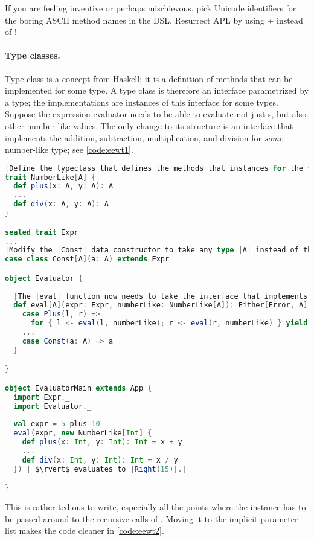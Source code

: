 \documentclass[10 pt]{article}
\begin{document}
\begin{example}
If you are feeling inventive or perhaps mischievous, pick Unicode identifiers for the boring ASCII method names in the DSL. Resurrect APL by using ÷ instead of !
\end{example}

\paragraph{Type classes.} Type class is a concept from Haskell\cite{haskell}; it is a definition of methods that can be implemented for some type. A type class is therefore an interface parametrized by a type; the implementations are instances of this interface for some types. Suppose the expression evaluator needs to be able to evaluate not just s, but also other number-like values. The only change to its structure is an interface that implements the addition, subtraction, multiplication, and division for \emph{some} number-like type; see \autoref{code:eewt1}.

\begin{lstlisting}[caption={Expression evaluator without typeclasses}, label={code:eewt1}, language=Scala, escapechar=|]
|Define the typeclass that defines the methods that instances for the type |A| must implement.|
trait NumberLike[A] {
  def plus(x: A, y: A): A
  ...
  def div(x: A, y: A): A
}

sealed trait Expr
...
|Modify the |Const| data constructor to take any type |A| instead of the concrete |Int|.|
case class Const[A](a: A) extends Expr

object Evaluator {
 
  |The |eval| function now needs to take the interface that implements the number-like behaviour for type |A|.| 
  def eval[A](expr: Expr, numberLike: NumberLike[A]): Either[Error, A] = expr match {
    case Plus(l, r) => 
      for { l <- eval(l, numberLike); r <- eval(r, numberLike) } yield numberLike.plus(l, r)
    ...
    case Const(a: A) => a
  }

}

object EvaluatorMain extends App {
  import Expr._
  import Evaluator._
  
  val expr = 5 plus 10
  eval(expr, new NumberLike[Int] {
    def plus(x: Int, y: Int): Int = x + y
    ...
    def div(x: Int, y: Int): Int = x / y
  }) | $\rvert$ evaluates to |Right(15)|.|

}
\end{lstlisting}

This is rather tedious to write, especially all the points where the  instance has to be passed around to the recursive calls of . Moving it to the implicit parameter list makes the code cleaner in \autoref{code:eewt2}.
\end{document}
